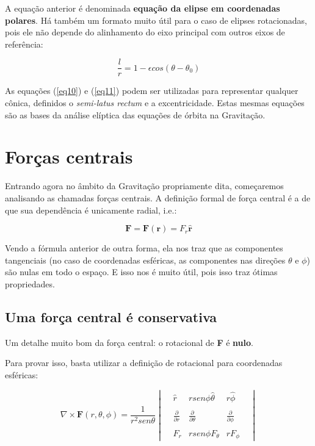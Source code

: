 A equação anterior é denominada \textbf{equação da elipse em coordenadas polares}. Há também um formato muito útil para o caso de elipses rotacionadas, pois ele não depende do alinhamento do eixo principal com outros eixos de referência:

\begin{equation}
	\frac{l}{r} = 1-\epsilon cos(\theta - \theta_0) \label{eq11}
\end{equation}

As equações (\ref{eq10}) e (\ref{eq11}) podem ser utilizadas para representar qualquer cônica, definidos o \textit{semi-latus rectum} e a excentricidade. Estas mesmas equações são as bases da análise elíptica das equações de órbita na Gravitação.

\newpage

\section{Forças centrais}

Entrando agora no âmbito da Gravitação propriamente dita, começaremos analisando as chamadas forças centrais. A definição formal de força central é a de que sua dependência é unicamente radial, i.e.:

\begin{equation}
	\mathbf{F} =\mathbf{F}(\mathbf{r}) = F_r \mathbf{\hat{r}} 
	\label{eq12}
\end{equation}

Vendo a fórmula anterior de outra forma, ela nos traz que as componentes tangenciais (no caso de coordenadas esféricas, as componentes nas direções $\theta$ e $\phi$) são nulas em todo o espaço. E isso nos é muito útil, pois isso traz ótimas propriedades.

\subsection{Uma força central é conservativa}

Um detalhe muito bom da força central: o rotacional de \textbf{F} é \textbf{nulo}. {\\}

Para provar isso, basta utilizar a definição de rotacional para coordenadas esféricas:

\begin{equation}
	\nabla \times \textbf{F} (r,\theta,\phi) = \frac{1}{r^2sen\theta} \begin{vmatrix} & \hat{r} &rsen\phi\hat{\theta} &  r\hat{\phi} & \\ \\ & \frac{\partial}{\partial r} & \frac{\partial}{\partial \theta} & \frac{\partial}{\partial \phi} & \\ \\ & F_r & rsen\phi F_{\theta} & rF_{\phi} & \end{vmatrix}
	\label{eq13}	
\end{equation}

